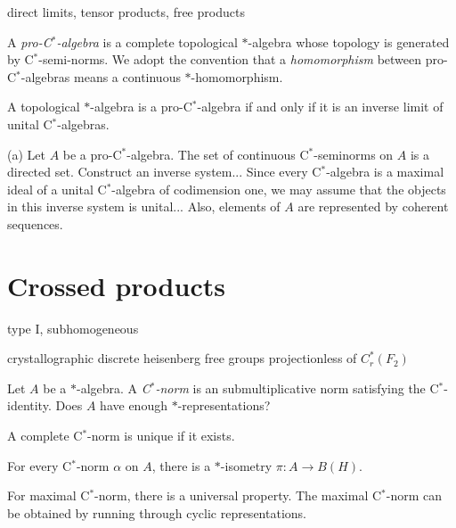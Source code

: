 \documentclass{../../large}
\begin{document}
direct limits, tensor products, free products



\begin{prb}
A \emph{pro-C$^*$-algebra} is a complete topological $*$-algebra whose topology is generated by C$^*$-semi-norms.
We adopt the convention that a \emph{homomorphism} between pro-C$^*$-algebras means a continuous $*$-homomorphism.
\begin{parts}
\item A topological $*$-algebra is a pro-C$^*$-algebra if and only if it is an inverse limit of unital C$^*$-algebras.
\end{parts}
\end{prb}
\begin{pf}
(a)
Let $A$ be a pro-C$^*$-algebra.
The set of continuous C$^*$-seminorms on $A$ is a directed set.
Construct an inverse system...
Since every C$^*$-algebra is a maximal ideal of a unital C$^*$-algebra of codimension one, we may assume that the objects in this inverse system is unital...
Also, elements of $A$ are represented by coherent sequences.
\end{pf}




\section{Crossed products}


\begin{prb}
\end{prb}



type I, subhomogeneous


crystallographic
discrete heisenberg
free groups
projectionless of $C_r^*(F_2)$



\begin{prb}
Let $A$ be a $*$-algebra.
A \emph{C$^*$-norm} is an submultiplicative norm satisfying the C$^*$-identity.
Does $A$ have enough $*$-representations?
\begin{parts}
\item A complete C$^*$-norm is unique if it exists.
\item For every C$^*$-norm $\alpha$ on $A$, there is a $*$-isometry $\pi:A\to B(H)$.
\item For maximal C$^*$-norm, there is a universal property. The maximal C$^*$-norm can be obtained by running through cyclic representations.
\end{parts}
\end{prb}
\end{document}

